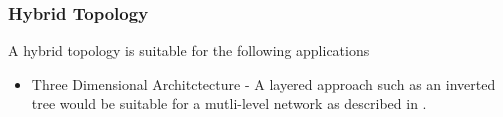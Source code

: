 \subsubsection{Hybrid Topology}
A hybrid topology is suitable for the following applications
\begin{itemize}
\item{Three Dimensional Architctecture - A layered approach such as an inverted tree would be
suitable for a mutli-level network as described in
\cite{tier_based_underwater_routing}.}

\end{itemize}



